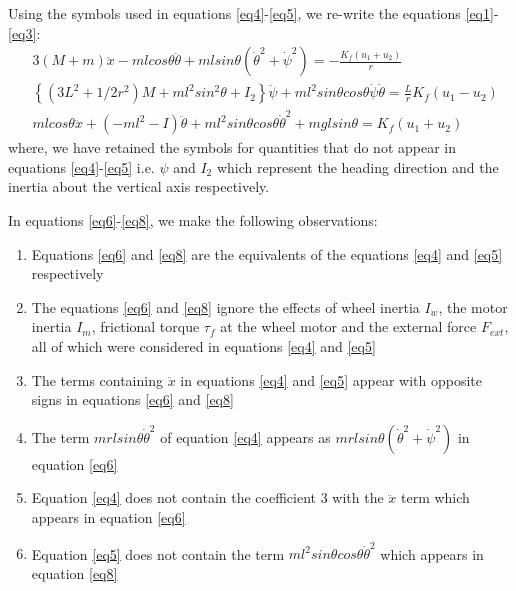 \documentclass[a4paper,10pt]{article}
\begin{document}
Using the symbols used in equations \ref{eq4}-\ref{eq5}, we re-write the equations \ref{eq1}-\ref{eq3}:
\begin{align}
 &3(M+m)\ddot{x}-mlcos\theta\ddot{\theta}+mlsin\theta({\dot{\theta}}^2+{\dot{\psi}}^2)=-\frac{K_f(u_1+u_2)}{r} \label{eq6} \\
 &\left\lbrace(3L^2+1/2r^2)M+ml^2sin^2\theta+I_2\right\rbrace\ddot{\psi}+ml^2sin\theta cos\theta\dot{\psi}\dot{\theta}=\frac{L}{r}K_f(u_1-u_2) \label{eq7} \\
 &mlcos\theta\ddot{x}+(-ml^2-I)\ddot{\theta}+ml^2sin\theta cos\theta {\dot{\theta}}^2+mglsin\theta=K_f(u_1+u_2) \label{eq8}
\end{align} where, we have retained the symbols for quantities that do not appear in equations 
\ref{eq4}-\ref{eq5} i.e. $\psi$ and $I_2$ which represent the heading direction and the inertia 
about the vertical axis respectively.

In equations \ref{eq6}-\ref{eq8}, we make the following observations:
\begin{enumerate}[label=(\roman*)]
 \item Equations \ref{eq6} and \ref{eq8} are the equivalents of the equations \ref{eq4} and \ref{eq5} respectively
 \item The equations \ref{eq6} and \ref{eq8} ignore the effects of wheel inertia $I_w$, the motor inertia $I_m$, frictional
 torque $\tau_f$ at the wheel motor and the external force $F_{ext}$, all of which were considered in equations \ref{eq4} and \ref{eq5}
 \item The terms containing $\ddot{x}$ in equations \ref{eq4} and \ref{eq5} appear with opposite signs in equations \ref{eq6} and \ref{eq8} \label{item:ddotx}
 \item The term $mrlsin\theta{\dot\theta}^2$ of equation \ref{eq4} appears as $mrlsin\theta({\dot\theta}^2+{\dot\psi}^2)$ in equation \ref{eq6} \label{item:psi}
 \item Equation \ref{eq4} does not contain the coefficient $3$ with the $\ddot{x}$ term which appears in equation \ref{eq6} \label{item:coeff3}
 \item Equation \ref{eq5} does not contain the term $ml^2sin\theta cos\theta {\dot{\theta}}^2$ which appears in equation \ref{eq8} \label{item:corriolis}
\end{enumerate}
\end{document}
